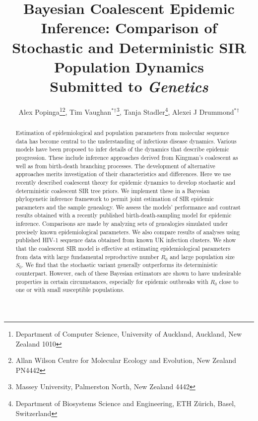 \documentclass[12pt,titlepage]{article}
\title{\LARGE{Bayesian Coalescent Epidemic Inference:  Comparison of Stochastic and Deterministic SIR Population Dynamics}\\
\vspace{10mm}
\small Submitted to {\em Genetics}}
\author{Alex Popinga\thanks{Department of Computer Science, University of Auckland, Auckland, New Zealand 1010}\thanks{Allan Wilson Centre for Molecular Ecology and Evolution, New Zealand PN4442},  
Tim Vaughan$^{\ast}$$^{\dag}$\thanks{Massey University, Palmerston North, New Zealand 4442}, 
Tanja Stadler\thanks{Department of Biosystems Science and Engineering, ETH Z\"urich, Basel, Switzerland}, 
Alexei J Drummond$^{\ast}$$^{\dag}$}
\begin{document}
\maketitle



\begin{abstract}

Estimation of epidemiological and population parameters from molecular sequence data has become central to the understanding of infectious disease dynamics.  
Various models have been proposed to infer details of the dynamics that describe epidemic progression. 
These include inference approaches derived from Kingman's coalescent as well as from birth-death branching processes.  
The development of alternative approaches merits investigation of their characteristics and differences. 
Here we use recently described coalescent theory for epidemic dynamics to develop stochastic and deterministic coalescent SIR tree priors. We implement these in a Bayesian phylogenetic inference framework to permit joint estimation of SIR epidemic parameters and the sample genealogy. 
We assess the models' performance and contrast results obtained with a recently published birth-death-sampling model for epidemic inference.  
Comparisons are made by analyzing sets of genealogies
simulated under precisely known epidemiological parameters.  
We also compare results of analyses using published HIV-1 sequence data obtained from
known UK infection clusters.  
We show that the coalescent SIR model is effective at estimating epidemiological parameters from data with large fundamental reproductive number $R_0$ and large population size $S_0$. 
We find that the stochastic variant generally outperforms its deterministic counterpart.  However, each of these Bayesian estimators are shown to have undesirable properties in certain circumstances, especially for epidemic outbreaks with $R_0$ close to one or with small susceptible populations.



\end{abstract}
\end{document}
